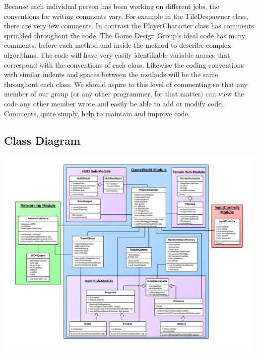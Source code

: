 \documentclass[10pt,letterpaper,oneside,english]{article}
\begin{document}
Because each individual person has been working on different jobs, the conventions for writing comments vary. For example in the TileDespawner class, there are very few comments. In contrast the PlayerCharacter class has comments sprinkled throughout the code. The Game Design Group’s ideal code has many comments: before each method and inside the method to describe complex algorithms. The code will have very easily identifiable variable names that correspond with the conventions of each class. Likewise the coding conventions with similar indents and spaces between the methods will be the same throughout each class. We should aspire to this level of commenting so that any member of our group (or any other programmer, for that matter) can view the code any other member wrote and easily be able to add or modify code. Comments, quite simply, help to maintain and improve code.

\subsection{Class Diagram}

\includegraphics[scale=.75]{class}
\end{document}
